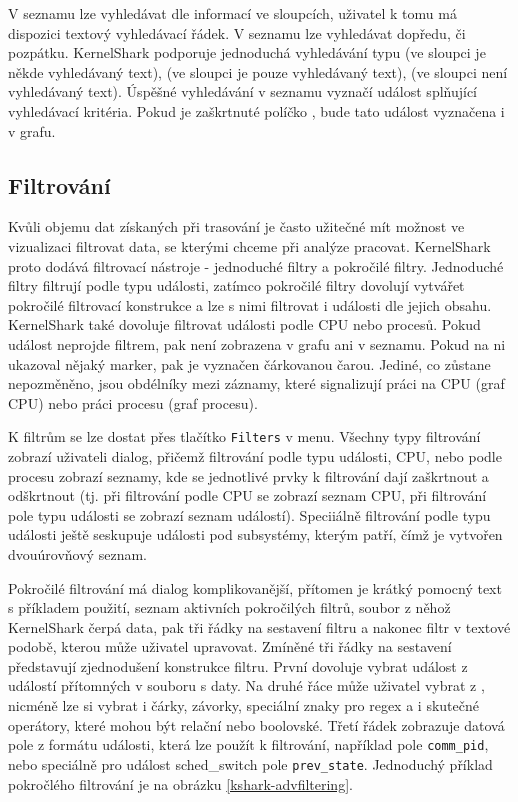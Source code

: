 V seznamu lze vyhledávat dle informací ve sloupcích, uživatel k tomu má dispozici textový vyhledávací řádek. V seznamu lze vyhledávat dopředu, či pozpátku. KernelShark podporuje jednoduchá vyhledávání typu  (ve sloupci je někde vyhledávaný text),  (ve sloupci je pouze vyhledávaný text),  (ve sloupci není vyhledávaný text). Úspěšné vyhledávání v seznamu vyznačí událost splňující vyhledávací kritéria. Pokud je zaškrtnuté políčko , bude tato událost vyznačena i v grafu.

\subsection*{Filtrování}
Kvůli objemu dat získaných při trasování je často užitečné mít možnost ve vizualizaci filtrovat data, se kterými chceme při analýze pracovat. KernelShark proto dodává filtrovací nástroje - jednoduché filtry a pokročilé filtry. Jednoduché filtry filtrují podle typu události, zatímco pokročilé filtry dovolují vytvářet pokročilé filtrovací konstrukce a lze s nimi filtrovat i události dle jejich obsahu. KernelShark také dovoluje filtrovat události podle CPU nebo procesů. Pokud událost neprojde filtrem, pak není zobrazena v grafu ani v seznamu. Pokud na ni ukazoval nějaký marker, pak je vyznačen čárkovanou čarou. Jediné, co zůstane nepozměněno, jsou obdélníky mezi záznamy, které signalizují práci na CPU (graf CPU) nebo práci procesu (graf procesu).

K filtrům se lze dostat přes tlačítko \texttt{Filters} v menu. Všechny typy filtrování zobrazí uživateli dialog, přičemž filtrování podle typu události, CPU, nebo podle procesu zobrazí seznamy, kde se jednotlivé prvky k filtrování dají zaškrtnout a odškrtnout (tj. při filtrování podle CPU se zobrazí seznam CPU, při filtrování pole typu události se zobrazí seznam událostí). Speciiálně filtrování podle typu události ještě seskupuje události pod subsystémy, kterým patří, čímž je vytvořen dvouúrovňový seznam.

Pokročilé filtrování má dialog komplikovanější, přítomen je krátký pomocný text s příkladem použití, seznam aktivních pokročilých filtrů, soubor z něhož KernelShark čerpá data, pak tři řádky na sestavení filtru a nakonec filtr v textové podobě, kterou může uživatel upravovat. Zmíněné tři řádky na sestavení představují zjednodušení konstrukce filtru. První dovoluje vybrat událost z událostí přítomných v souboru s daty. Na druhé řáce může uživatel vybrat z , nicméně lze si vybrat i čárky, závorky, speciální znaky pro regex a i skutečné operátory, které mohou být relační nebo boolovské. Třetí řádek zobrazuje datová pole z formátu události, která lze použít k filtrování, například pole \texttt{comm\_pid}, nebo speciálně pro událost sched\_switch pole \texttt{prev\_state}. Jednoduchý příklad pokročlého filtrování je na obrázku \ref{kshark-advfiltering}.

